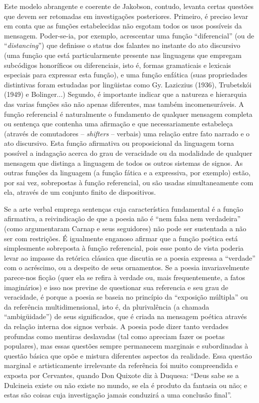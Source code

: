 Este modelo abrangente e coerente de Jakobson, contudo, levanta certas
questões que devem ser retomadas em investigações posteriores. Primeiro,
é preciso levar em conta que as funções estabelecidas não esgotam todos
os usos possíveis da mensagem. Poder-se-ia, por exemplo, acrescentar uma
função ``diferencial'' (ou de ``\emph{distancing}'') que definisse o
status dos falantes no instante do ato discursivo (uma função que está
particularmente presente nas linguagens que empregam subcódigos
honoríficos ou diferenciais, isto é, formas gramaticais e lexicais
especiais para expressar esta função), e uma função enfática (suas
propriedades distintivas foram estudadas por lingüistas como Gy.
Laziczius (1936), Trubetskói (1949) e Bolinger...) Segundo, é importante
indicar que a natureza e hierarquia das varias funções são não apenas
diferentes, mas também incomensuráveis. A função referencial é
naturalmente o fundamento de qualquer mensagem completa ou sentença que
contenha uma afirmação e que necessariamente estabeleça (através de
comutadores -- \emph{shifters} -- verbais) uma relação entre fato
narrado e o ato discursivo. Esta função afirmativa ou proposicional da
linguagem torna possível a indagação acerca do grau de veracidade ou da
modalidade de qualquer mensagem que distinga a linguagem de todos os
outros sistemas de signos. As outras funções da linguagem (a função
fática e a expressiva, por exemplo) estão, por sai vez, sobrepostas à
função referencial, ou são usadas simultaneamente com ela, através de um
conjunto finito de dispositivos.

Se a arte verbal emprega sentenças cuja característica fundamental é a
função afirmativa, a reivindicação de que a poesia não é ``nem falsa nem
verdadeira'' (como argumentaram Carnap e seus seguidores) não pode ser
sustentada a não ser com restrições. É igualmente enganoso afirmar que a
função poética está simplesmente sobreposta à função referencial, pois
esse ponto de vista poderia levar ao impasse da retórica clássica que
discutia se a poesia expressa a ``verdade'' com o acréscimo, ou a
despeito de seus ornamentos. Se a poesia invariavelmente parece-nos
ficção (quer ela se refira à verdade ou, mais frequentemente, a fatos
imaginários) e isso nos previne de questionar sua referencia e seu grau
de veracidade, é porque a poesia se baseia no princípio da ``exposição
múltipla'' ou da referência multidimensional, isto é, da plurivalência
(a chamada ``ambigüidade'') de seus significados, que é criada na
mensagem poética através da relação interna dos signos verbais. A poesia
pode dizer tanto verdades profundas como mentiras deslavadas (tal como
apreciam fazer os poetas populares), mas essas questões sempre
permanecem marginais e subordinadas à questão básica que opõe e mistura
diferentes aspectos da realidade. Essa questão marginal e artisticamente
irrelevante da referência foi muito compreendida e exposta por
Cervantes, quando Don Quixote diz à Duquesa: ``Deus sabe se a Dulcineia
existe ou não existe no mundo, se ela é produto da fantasia ou não; e
estas são coisas cuja investigação jamais conduzirá a uma conclusão
final''.

